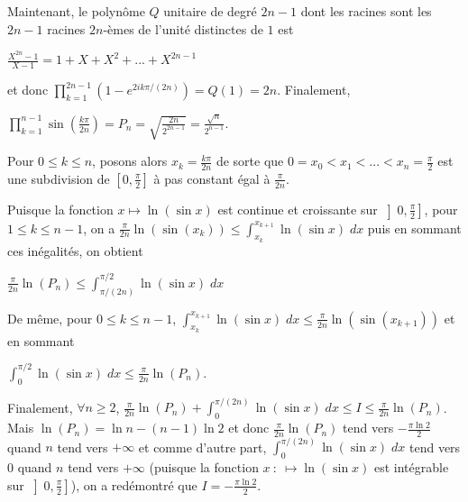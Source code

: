 {{Maintenant, le polynôme $Q$ unitaire de degré $2n-1$ dont les racines sont les $2n-1$ racines $2n$-èmes de l'unité distinctes de $1$ est

\begin{center}
$\frac{X^{2n}-1}{X-1}= 1+X+X^2+...+X^{2n-1}$
\end{center}

et  donc $\prod_{k=1}^{2n-1}\left(1-e^{2ik\pi/(2n)}\right)=Q(1)=2n$. Finalement,

\begin{center}
$\prod_{k=1}^{n-1}\sin\left(\frac{k\pi}{2n}\right)=P_n=\sqrt{\frac{2n}{2^{2n-1}}}=\frac{\sqrt{n}}{2^{n-1}}$.
\end{center}

Pour $0\leqslant k\leqslant n$, posons alors $x_k=\frac{k\pi}{2n}$ de sorte que $0 = x_0 < x_1< ...< x_n =\frac{\pi}{2}$ est une subdivision de $\left[0,\frac{\pi}{2}\right]$
à pas constant égal à $\frac{\pi}{2n}$.

Puisque la fonction $x\mapsto\ln(\sin x)$ est continue et croissante sur $\left]0,\frac{\pi}{2}\right]$, pour $1\leqslant k\leqslant n-1$, on a  $\frac{\pi}{2n}\ln(\sin(x_k))\leqslant\int_{x_k}^{x_{k+1}}\ln(\sin x)\;dx$ puis en sommant  ces inégalités, on obtient 

\begin{center}
$\frac{\pi}{2n}\ln(P_n)\leqslant\int_{\pi/(2n)}^{\pi/2}\ln(\sin x)\;dx$
\end{center}

De même, pour $0\leqslant k\leqslant n-1$,  $\int_{x_k}^{x_{k+1}}\ln(\sin x)\;dx\leqslant\frac{\pi}{2n}\ln(\sin(x_{k+1}))$ et en sommant  

\begin{center}
$\int_{0}^{\pi/2}\ln(\sin x)\;dx\leqslant\frac{\pi}{2n}\ln(P_n)$.
\end{center}

Finalement,  $\forall n\geqslant2$, $\frac{\pi}{2n}\ln(P_n)+\int_{0}^{\pi/(2n)}\ln(\sin x)\;dx\leqslant I\leqslant\frac{\pi}{2n}\ln(P_n)$. Mais $\ln(P_n) =\ln n -(n-1)\ln2$ et donc  $\frac{\pi}{2n}\ln(P_n)$ tend vers $-\frac{\pi\ln2}{2}$ quand $n$ tend vers $+\infty$ et comme d'autre part, $\int_{0}^{\pi/(2n)}\ln(\sin x)\;dx$ tend vers $0$ quand $n$ tend vers $+\infty$ (puisque la fonction $x~:~\mapsto\ln(\sin x)$ est intégrable sur $\left]0,\frac{\pi}{2}\right]$), on a redémontré que $I = -\frac{\pi\ln2}{2}$.
}
}

